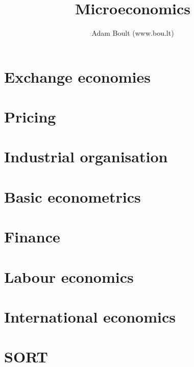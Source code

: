 \documentclass[oneside]{book}
\begin{document}
\author{Adam Boult (www.bou.lt)}
\title{Microeconomics}
\maketitle

\setcounter{tocdepth}{0}
\tableofcontents



\part{Exchange economies}




\part{Pricing}





\part{Industrial organisation}



\part{Basic econometrics}






\part{Finance}






\part{Labour economics}



\part{International economics}



\part{SORT}



\end{document}
